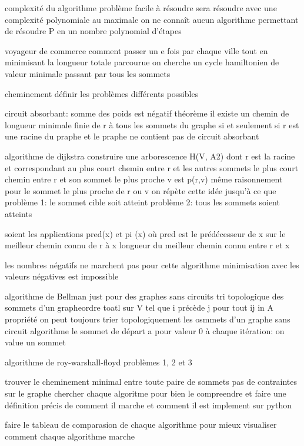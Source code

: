 \documentclass{article}
\begin{document}
complexité du algorithme
problème facile à résoudre sera résoudre avec une complexité polynomiale au maximale
on ne connaît aucun algorithme permettant de résoudre P en un nombre polynomial d'étapes


voyageur de commerce
comment passer un e fois par chaque ville tout en minimisant la longueur totale parcourue
on cherche un cycle hamiltonien de valeur minimale
passant par tous les sommets


cheminement
définir les problèmes différents possibles


circuit absorbant: somme des poids est négatif
théorème il existe un chemin de longueur minimale finie de r à tous les sommets du graphe
si et seulement si r est une racine du praphe et le praphe ne contient pas de circuit absorbant

algorithme de dijkstra
construire une arborescence H(V, A2) dont r est la racine et correspondant au plus court chemin entre r et les autres sommets
le plus court chemin entre r et son sommet le plus proche v est p(r,v)
même raisonnement pour le sommet le plus proche de r ou v
on répète cette idée jusqu'à ce que
    problème 1: le sommet cible soit atteint
    problème 2: tous les sommets soient atteints

soient les applications pred(x) et pi (x)
    où pred est le prédécesseur de x sur le meilleur chemin connu de r à x
    longueur du meilleur chemin connu entre r et x

    les nombres négatifs ne marchent pas pour cette algorithme
    minimisation avec les valeurs négatives est impossible



algorithme de Bellman
just pour des graphes sans circuits
tri topologique des sommets d'un grapheordre toatl sur V tel que i précède j pour tout ij in A
propriété on peut toujours trier topologiquement les osmmets d'un graphe sans circuit
algorithme
    le sommet de départ a pour valeur 0
    à chaque itération: on value un sommet


algorithme de roy-warshall-floyd
problèmes 1, 2 et 3

trouver le cheminement minimal entre toute paire de sommets pas de contraintes sur le graphe
chercher chaque algoritme pour bien le compreendre et faire une définition précis de comment il marche et comment il est implement sur python


faire le tableau de comparasion de chaque algorithme pour mieux visualiser comment chaque algorithme marche
\end{document}
